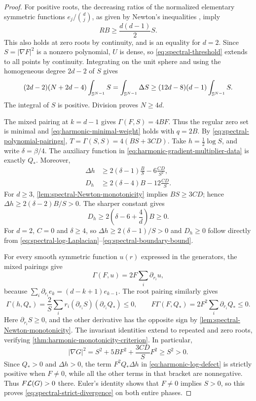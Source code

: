 \begin{proof}
For positive roots, the decreasing ratios of the normalized elementary symmetric
functions \(e_j/\binom dj\), as given by Newton's inequalities
\cite[Section~3.1]{BorceaBrandenLiggett09}, imply
\begin{equation}\label{eq:spectral-radial-Newton}
 R B\ge\frac{d(d-1)}2S.
\end{equation}
This also holds at zero roots by continuity, and is an equality for
\(d=2\). Since \(S=|\nabla F|^2\) is a nonzero polynomial,
\(U\) is dense, so \eqref{eq:spectral-threshold} extends to all
points by continuity. Integrating on the unit sphere and using the
homogeneous degree \(2d-2\) of \(S\) gives
\[
 (2d-2)(N+2d-4)\int_{\mathbb S^{N-1}}S
 =\int_{\mathbb S^{N-1}}\Delta S
 \ge(12d-8)(d-1)\int_{\mathbb S^{N-1}}S.
\]
The integral of \(S\) is positive. Division proves \(N\ge4d\).

The mixed pairing at \(k=d-1\) gives
\(\Gamma(F,S)=4BF\).  Thus the regular zero set is minimal and
\eqref{eq:harmonic-minimal-weight} holds with \(q=2B\).
By \eqref{eq:spectral-polynomial-pairings}, \(T=\Gamma(S,S)=4(BS+3CD)\).
Take \(h=\tfrac12\log S\), and write
\(\delta=\beta/4\).  The auxiliary function in
\eqref{eq:harmonic-gradient-multiplier-data} is exactly \(Q_*\).
Moreover,
\begin{align}
 \Delta h&\ge2(\delta-1)\frac BS-6\frac{CD}{S^2},
 \label{eq:spectral-log-Laplacian}\\
 D_h&\ge2(\delta-4)B-12\frac{CD}{S}.
 \label{eq:spectral-boundary-bound}
\end{align}
For \(d\ge3\), \cref{lem:spectral-Newton-monotonicity} implies
\(BS\ge3CD\); hence
\(\Delta h\ge2(\delta-2)B/S>0\).  The sharper constant gives
\[
 D_h\ge2\left(\delta-6+\frac4d\right)B\ge0.
\]
For \(d=2\), \(C=0\) and \(\delta\ge4\), so
\(\Delta h\ge2(\delta-1)/S>0\) and \(D_h\ge0\) follow
directly from \eqref{eq:spectral-log-Laplacian}--\eqref{eq:spectral-boundary-bound}.

For every smooth symmetric function \(u(r)\)
expressed in the generators, the mixed pairings give
\begin{equation}\label{eq:spectral-root-derivation}
 \Gamma(F,u)=2F\sum_i\partial_{r_i}u,
\end{equation}
because \(\sum_i\partial_{r_i}e_k=(d-k+1)e_{k-1}\).
The root pairing similarly gives
\[
 \Gamma(h,Q_*)=
 \frac2S\sum_i r_i(\partial_{r_i}S)(\partial_{r_i}Q_*)\le0,
 \qquad
 F\Gamma(F,Q_*)=2F^2\sum_i\partial_{r_i}Q_*\le0.
\]
Here \(\partial_{r_i}S\ge0\), and the other derivative has the
opposite sign by \cref{lem:spectral-Newton-monotonicity}.
The invariant identities extend to repeated and zero roots, verifying
\cref{thm:harmonic-monotonicity-criterion}. In particular,
\begin{equation}\label{eq:spectral-gradient-norm}
 |\nabla G|^2=S^2+5BF^2+\frac{3CD}{S}F^2\ge S^2>0.
\end{equation}
Since \(Q_*>0\) and \(\Delta h>0\), the term
\(F^2Q_*\Delta h\) in \eqref{eq:harmonic-log-defect} is strictly
positive when \(F\ne0\), while all the other terms in that bracket
are nonnegative. Thus \(F\mathcal L(G)>0\) there. Euler's identity shows
that \(F\ne0\) implies \(S>0\), so this proves
\eqref{eq:spectral-strict-divergence} on both entire phases.


\end{proof}
